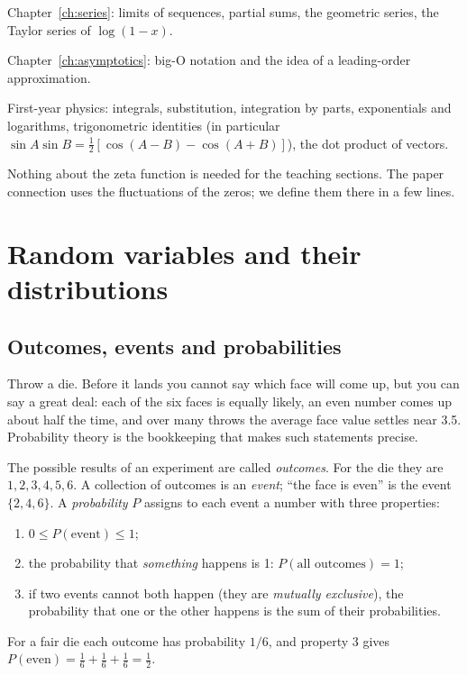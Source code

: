 \begin{prerequisites}


\item Chapter~\ref{ch:series}: limits of sequences, partial sums, the geometric series, the Taylor series of $\log(1-x)$.
\item Chapter~\ref{ch:asymptotics}: big-O notation and the idea of a leading-order approximation.
\item First-year physics: integrals, substitution, integration by parts, exponentials and logarithms, trigonometric identities (in particular $\sin A\sin B=\tfrac12[\cos(A-B)-\cos(A+B)]$), the dot product of vectors.
\item Nothing about the zeta function is needed for the teaching sections. The paper connection uses the fluctuations of the zeros; we define them there in a few lines.


\end{prerequisites}

\section{Random variables and their distributions}\label{sec:probability-distributions}

\subsection{Outcomes, events and probabilities}

Throw a die. Before it lands you cannot say which face will come up, but you can say a great deal: each of the six faces is equally likely, an even number comes up about half the time, and over many throws the average face value settles near 3.5. Probability theory is the bookkeeping that makes such statements precise.

The possible results of an experiment are called \emph{outcomes}. For the die they are $1,2,3,4,5,6$. A collection of outcomes is an \emph{event}; ``the face is even'' is the event $\{2,4,6\}$. A \emph{probability} $P$ assigns to each event a number with three properties:
\begin{enumerate}
\item $0\le P(\text{event})\le 1$;
\item the probability that \emph{something} happens is 1: $P(\text{all outcomes})=1$;
\item if two events cannot both happen (they are \emph{mutually exclusive}), the probability that one or the other happens is the sum of their probabilities.
\end{enumerate}
For a fair die each outcome has probability $1/6$, and property 3 gives $P(\text{even})=\tfrac16+\tfrac16+\tfrac16=\tfrac12$.

